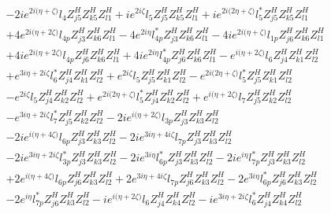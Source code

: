  \begin{align} 
 & -2 i e^{2 i \Big(\eta +\zeta \Big)} l_4 Z_{{j 5}}^{H} Z_{{k 5}}^{H} Z_{{l 1}}^{H} +i e^{2 i \zeta } l_5 Z_{{j 5}}^{H} Z_{{k 5}}^{H} Z_{{l 1}}^{H} +i e^{2 i \Big(2 \eta +\zeta \Big)} l_5^* Z_{{j 5}}^{H} Z_{{k 5}}^{H} Z_{{l 1}}^{H} \nonumber \\ 
 &+4 e^{2 i \Big(\eta +2 \zeta \Big)} l_{4p} Z_{{j 3}}^{H} Z_{{k 6}}^{H} Z_{{l 1}}^{H} -4 e^{2 i \eta } l_{4p}^* Z_{{j 3}}^{H} Z_{{k 6}}^{H} Z_{{l 1}}^{H} -4 i e^{2 i \Big(\eta +\zeta \Big)} l_{1p} Z_{{j 6}}^{H} Z_{{k 6}}^{H} Z_{{l 1}}^{H} \nonumber \\ 
 &+4 i e^{2 i \Big(\eta +2 \zeta \Big)} l_{4p} Z_{{j 6}}^{H} Z_{{k 6}}^{H} Z_{{l 1}}^{H} +4 i e^{2 i \eta } l_{4p}^* Z_{{j 6}}^{H} Z_{{k 6}}^{H} Z_{{l 1}}^{H} - e^{i \Big(\eta +2 \zeta \Big)} l_6 Z_{{j 4}}^{H} Z_{{k 1}}^{H} Z_{{l 2}}^{H} \nonumber \\ 
 &+e^{3 i \eta +2 i \zeta } l_6^* Z_{{j 4}}^{H} Z_{{k 1}}^{H} Z_{{l 2}}^{H} +e^{2 i \zeta } l_5 Z_{{j 5}}^{H} Z_{{k 1}}^{H} Z_{{l 2}}^{H} - e^{2 i \Big(2 \eta +\zeta \Big)} l_5^* Z_{{j 5}}^{H} Z_{{k 1}}^{H} Z_{{l 2}}^{H} \nonumber \\ 
 &- e^{2 i \zeta } l_5 Z_{{j 4}}^{H} Z_{{k 2}}^{H} Z_{{l 2}}^{H} +e^{2 i \Big(2 \eta +\zeta \Big)} l_5^* Z_{{j 4}}^{H} Z_{{k 2}}^{H} Z_{{l 2}}^{H} +e^{i \Big(\eta +2 \zeta \Big)} l_7 Z_{{j 5}}^{H} Z_{{k 2}}^{H} Z_{{l 2}}^{H} \nonumber \\ 
 &- e^{3 i \eta +2 i \zeta } l_7^* Z_{{j 5}}^{H} Z_{{k 2}}^{H} Z_{{l 2}}^{H} -2 i e^{i \Big(\eta +2 \zeta \Big)} l_{3p} Z_{{j 3}}^{H} Z_{{k 3}}^{H} Z_{{l 2}}^{H} \nonumber \\ 
 &-2 i e^{i \Big(\eta +4 \zeta \Big)} l_{6p} Z_{{j 3}}^{H} Z_{{k 3}}^{H} Z_{{l 2}}^{H} -2 i e^{3 i \eta +4 i \zeta } l_{7p} Z_{{j 3}}^{H} Z_{{k 3}}^{H} Z_{{l 2}}^{H} \nonumber \\ 
 &-2 i e^{3 i \eta +2 i \zeta } l_{3p}^* Z_{{j 3}}^{H} Z_{{k 3}}^{H} Z_{{l 2}}^{H} -2 i e^{3 i \eta } l_{6p}^* Z_{{j 3}}^{H} Z_{{k 3}}^{H} Z_{{l 2}}^{H} -2 i e^{i \eta } l_{7p}^* Z_{{j 3}}^{H} Z_{{k 3}}^{H} Z_{{l 2}}^{H} \nonumber \\ 
 &+2 e^{i \Big(\eta +4 \zeta \Big)} l_{6p} Z_{{j 6}}^{H} Z_{{k 3}}^{H} Z_{{l 2}}^{H} +2 e^{3 i \eta +4 i \zeta } l_{7p} Z_{{j 6}}^{H} Z_{{k 3}}^{H} Z_{{l 2}}^{H} -2 e^{3 i \eta } l_{6p}^* Z_{{j 6}}^{H} Z_{{k 3}}^{H} Z_{{l 2}}^{H} \nonumber \\ 
 &-2 e^{i \eta } l_{7p}^* Z_{{j 6}}^{H} Z_{{k 3}}^{H} Z_{{l 2}}^{H} -i e^{i \Big(\eta +2 \zeta \Big)} l_6 Z_{{j 4}}^{H} Z_{{k 4}}^{H} Z_{{l 2}}^{H} -i e^{3 i \eta +2 i \zeta } l_6^* Z_{{j 4}}^{H} Z_{{k 4}}^{H} Z_{{l 2}}^{H} \nonumber \\ 

\end{align}

